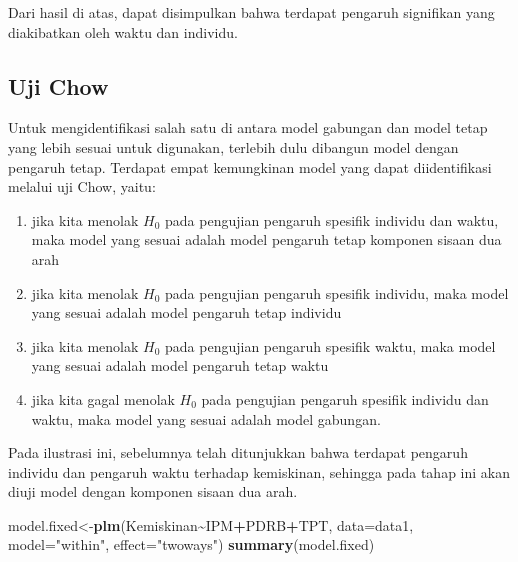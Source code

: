 \documentclass[
]{book}
\newenvironment{Shaded}{\begin{snugshade}}{\end{snugshade}}
\newcommand{\DataTypeTok}[1]{\textcolor[rgb]{0.13,0.29,0.53}{#1}}
\newcommand{\KeywordTok}[1]{\textcolor[rgb]{0.13,0.29,0.53}{\textbf{#1}}}
\newcommand{\NormalTok}[1]{#1}
\newcommand{\OperatorTok}[1]{\textcolor[rgb]{0.81,0.36,0.00}{\textbf{#1}}}
\newcommand{\StringTok}[1]{\textcolor[rgb]{0.31,0.60,0.02}{#1}}
\begin{document}
Dari hasil di atas, dapat disimpulkan bahwa terdapat pengaruh signifikan yang diakibatkan oleh waktu dan individu.

\hypertarget{uji-chow}{%
\subsection{Uji Chow}\label{uji-chow}}

Untuk mengidentifikasi salah satu di antara model gabungan dan model tetap yang lebih sesuai untuk digunakan, terlebih dulu dibangun model dengan pengaruh tetap. Terdapat empat kemungkinan model yang dapat diidentifikasi melalui uji Chow, yaitu:

\begin{enumerate}
\def\labelenumi{(\arabic{enumi})}
\item
  jika kita menolak \(H_0\) pada pengujian pengaruh spesifik individu dan waktu, maka model yang sesuai adalah model pengaruh tetap komponen sisaan dua arah
\item
  jika kita menolak \(H_0\) pada pengujian pengaruh spesifik individu, maka model yang sesuai adalah model pengaruh tetap individu
\item
  jika kita menolak \(H_0\) pada pengujian pengaruh spesifik waktu, maka model yang sesuai adalah model pengaruh tetap waktu
\item
  jika kita gagal menolak \(H_0\) pada pengujian pengaruh spesifik individu dan waktu, maka model yang sesuai adalah model gabungan.
\end{enumerate}

Pada ilustrasi ini, sebelumnya telah ditunjukkan bahwa terdapat pengaruh individu dan pengaruh waktu terhadap kemiskinan, sehingga pada tahap ini akan diuji model dengan komponen sisaan dua arah.

\begin{Shaded}
\begin{Highlighting}[]
\NormalTok{model.fixed\textless{}{-}}\KeywordTok{plm}\NormalTok{(Kemiskinan}\OperatorTok{\textasciitilde{}}\NormalTok{IPM}\OperatorTok{+}\NormalTok{PDRB}\OperatorTok{+}\NormalTok{TPT, }\DataTypeTok{data=}\NormalTok{data1, }\DataTypeTok{model=}\StringTok{"within"}\NormalTok{, }\DataTypeTok{effect=}\StringTok{"twoways"}\NormalTok{)}
\KeywordTok{summary}\NormalTok{(model.fixed)}
\end{Highlighting}
\end{Shaded}
\end{document}
